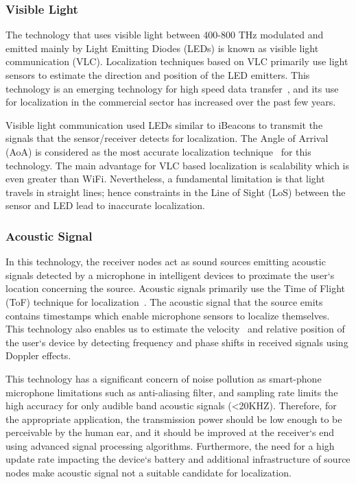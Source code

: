\documentclass[a4paper,singleside,12pt]{report} %
\begin{document}
				\subsubsection{Visible Light}

					The technology that uses visible light between 400-800 THz modulated and emitted mainly by Light Emitting Diodes (LEDs) is known as visible light communication (VLC). 
					Localization techniques based on VLC primarily use light sensors to estimate the direction and position of the LED emitters. 
					This technology is an emerging technology for high speed data transfer~\cite{kuo2014luxapose}, and its use for localization in the commercial sector has increased over the past few years. 
					
					Visible light communication used LEDs similar to iBeacons to transmit the signals that the sensor/receiver detects for localization. 
					The Angle of Arrival (AoA) is considered as the most accurate localization technique~\cite{kuo2014luxapose,armstrong2013visible} for this technology. 
					The main advantage for VLC based localization is scalability which is even greater than WiFi. 
					Nevertheless, a fundamental limitation is that light travels in straight lines; hence constraints in the Line of Sight (LoS) between the sensor and LED lead to inaccurate localization.  

				\subsubsection{Acoustic Signal}
					In this technology, the receiver nodes act as sound sources emitting acoustic signals detected by a microphone in intelligent devices to proximate the user`s location concerning the source. 
					Acoustic signals primarily use the Time of Flight (ToF) technique for localization~\cite{liu2013guoguo}. The acoustic signal that the source emits contains timestamps which enable microphone sensors to localize themselves. 
					This technology also enables us to estimate the velocity~\cite{huang2014swadloon} and relative position of the user`s device by detecting frequency and phase shifts in received signals using Doppler effects.
					
					This technology has a significant concern of noise pollution as smart-phone microphone limitations such as anti-aliasing filter, and sampling rate limits the high accuracy for only audible band acoustic signals (<20KHZ). 
					Therefore, for the appropriate application, the transmission power should be low enough to be perceivable by the human ear, and it should be improved at the receiver`s end using advanced signal processing algorithms. 
					Furthermore, the need for a high update rate impacting the device`s battery and additional infrastructure of source nodes make acoustic signal not a suitable candidate for localization.  
\end{document}
